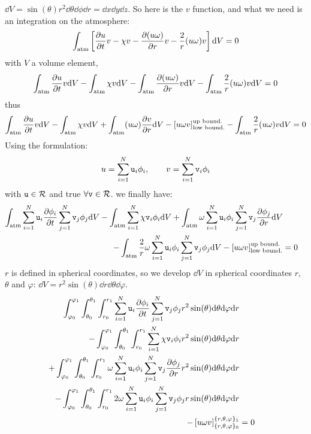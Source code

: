 $\dd V = \sin(\theta)r^2\dd\theta\dd\phi\dd r = \dd x \dd y \dd z$.
So here is the $v$ function, and what we need is an integration on
the atmosphere:
\begin{equation}
\int_{\text{atm}}\left[\frac{\partial u}{\partial t}v - \chi v - \frac{\partial(u\omega)}{\partial r}v - \frac{2}{r}(u\omega)v\right] \mathrm{d} V = 0
\end{equation}
with $V$ a volume element,
\begin{equation}
  \int_{\text{atm}}\frac{\partial u}{\partial t}v\mathrm{d} V 
- \int_{\text{atm}}\chi v \mathrm{d} V 
- \int_{\text{atm}}\frac{\partial(u\omega)}{\partial r}v \mathrm{d} V 
- \int_{\text{atm}}\frac{2}{r}(u\omega)v \mathrm{d} V = 0
\label{math:photo_3D_start}
\end{equation}
thus
\begin{equation}
  \int_{\text{atm}}\frac{\partial u}{\partial t}v\mathrm{d} V 
- \int_{\text{atm}}\chi v \mathrm{d} V 
+ \int_{\text{atm}}(u\omega)\frac{\partial v}{\partial r} \mathrm{d} V 
- \left[u\omega v\right]^{\text{up bound.}}_{\text{low bound.}}
- \int_{\text{atm}}\frac{2}{r}(u\omega)v \mathrm{d} V = 0
\end{equation}
Using the formulation:
\begin{equation}
u = \sum_{i=1}^N \mathtt{u}_i \phi_i,\qquad v = \sum_{i=1}^N\mathtt{v}_i \phi_i
\end{equation}
with $\mathtt{u} \in \mathcal{R}$ and true $\forall \mathtt{v} \in \mathcal{R}$. 
we finally have:
\begin{equation}
\begin{split}
  \int_{\text{atm}}\sum_{i=1}^N\mathtt{u}_i\frac{\partial\phi_i}{\partial t}\sum_{j=1}^N\mathtt{v}_j \phi_j \mathrm{d} V 
- \int_{\text{atm}}\sum_{i=1}^N\chi\mathtt{v}_i\phi_i \mathrm{d} V 
+ \int_{\text{atm}}\omega\sum_{i=1}^N\mathtt{u}_i\phi_i\sum_{j=1}^N\mathtt{v}_j\frac{\partial\phi_j}{\partial r} \mathrm{d} V \\
- \int_{\text{atm}}\frac{2}{r}\omega\sum_{i=1}^N\mathtt{u}_i\phi_i\sum_{j=1}^N\mathtt{v}_j\phi_j\mathrm{d} V 
- \left[u\omega v\right]^{\text{up bound.}}_{\text{low bound.}} & = 0
\end{split}
\end{equation}
$r$ is defined in spherical coordinates, so we develop $\dd V$ in spherical coordinates $r$,
$\theta$ and $\varphi$:
$\dd V = r^2\sin(\theta)\dd r\dd\theta\dd\varphi$.
\begin{equation}
\begin{split}
  \int_{\varphi_0}^{\varphi_1}\int_{\theta_0}^{\theta_1}\int_{r_0}^{r_1} \sum_{i=1}^N\mathtt{u}_i\frac{\partial\phi_i}{\partial t}\sum_{j=1}^N\mathtt{v}_j \phi_j r^2\sin(\theta)\mathrm{d}\theta\mathrm{d}\varphi\mathrm{d} r \\
- \int_{\varphi_0}^{\varphi_1}\int_{\theta_0}^{\theta_1}\int_{r_0}^{r_1} \sum_{i=1}^N\chi\mathtt{v}_i\phi_i r^2\sin(\theta)\mathrm{d}\theta\mathrm{d}\varphi\mathrm{d} r \\
+ \int_{\varphi_0}^{\varphi_1}\int_{\theta_0}^{\theta_1}\int_{r_0}^{r_1} \omega\sum_{i=1}^N\mathtt{u}_i\phi_i\sum_{j=1}^N\mathtt{v}_j\frac{\partial\phi_j}{\partial r} r^2\sin(\theta)\mathrm{d}\theta\mathrm{d}\varphi\mathrm{d} r \\
- \int_{\varphi_0}^{\varphi_1}\int_{\theta_0}^{\theta_1}\int_{r_0}^{r_1} 2\omega\sum_{i=1}^N\mathtt{u}_i\phi_i\sum_{j=1}^N\mathtt{v}_j\phi_jr\sin(\theta)\mathrm{d}\theta\mathrm{d}\varphi\mathrm{d} r \\
- \left[u\omega v\right]^{\{r,\theta,\varphi\}_1}_{\{r,\theta,\varphi\}_0} & = 0
\end{split}
\end{equation}
